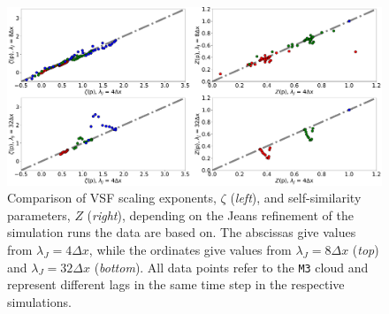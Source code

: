 \begin{figure}
	\centering
    \includegraphics[width=\textwidth]{comp_jeans.pdf}
    \caption{Comparison of VSF scaling exponents, $\zeta$ (\textit{left}), and self-similarity parameters, $Z$ (\textit{right}), depending on the Jeans refinement of the simulation runs the data are based on. The abscissas give values from $\lambda_J = 4\Delta{}x$, while the ordinates give values from $\lambda_J = 8\Delta{}x$ (\textit{top}) and $\lambda_J = 32\Delta{}x$ (\textit{bottom}). All data points refer to the \texttt{M3} cloud and represent different lags in the same time step in the respective simulations. 
    }
    \label{pic:results:jeans_comp}
\end{figure}

